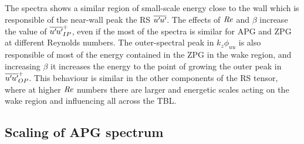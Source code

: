 The spectra shows a similar region of small-scale energy close to the wall which is responsible of the near-wall peak the RS $\overline{u^{\prime}\mkern-1.2mu u^{\prime}\mkern-1.2mu}$. The effects of $\mbox{\textit{Re}}$ and $\beta$ increase the value of $\overline{u^{\prime}\mkern-1.2mu u^{\prime}\mkern-1.2mu}_{IP}^+$, even if the most of the spectra is similar for APG and ZPG at different Reynolds numbers.
The outer-spectral peak in $k_z\phi_{uu}$ is also responsible of most of the energy contained in the ZPG in the wake region, and increasing $\beta$ it increases the energy to the point of growing the outer peak in $\overline{u^{\prime}\mkern-1.2mu u^{\prime}\mkern-1.2mu}_{OP}^+$. This behaviour is similar in the other components of the RS tensor, where at higher $\mbox{\textit{Re}}$ numbers there are larger and energetic scales acting on the wake region and influencing all across the TBL.

\subsection{Scaling of APG spectrum}

